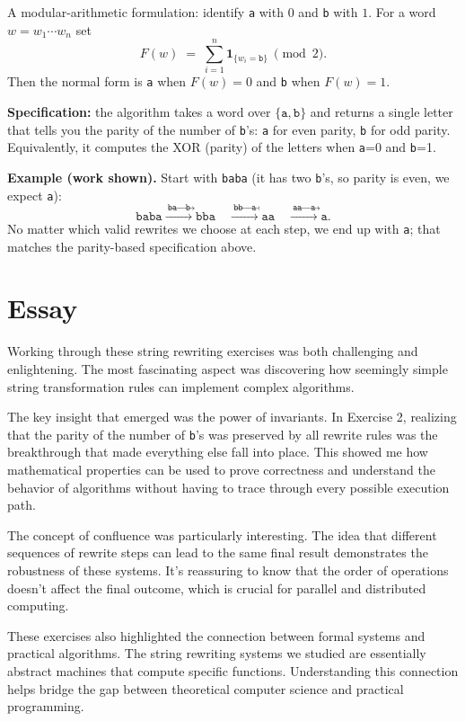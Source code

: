 \documentclass{article}
\theoremstyle{plain}
\theoremstyle{definition}
\theoremstyle{remark}
\begin{document}
\begin{enumerate}[label=(\alph*)]
  A modular-arithmetic formulation: identify \texttt{a} with $0$ and \texttt{b} with $1$. For a word $w=w_1\cdots w_n$ set
  \[
    F(w)\;=\;\sum_{i=1}^n \mathbf{1}_{\{w_i=\texttt{b}\}}\ \pmod{2}.
  \]
  Then the normal form is \texttt{a} when $F(w)=0$ and \texttt{b} when $F(w)=1$.
  
  \textbf{Specification:} the algorithm takes a word over $\{\texttt{a},\texttt{b}\}$ and returns a single letter that tells you the parity of the number of \texttt{b}'s: \texttt{a} for even parity, \texttt{b} for odd parity. Equivalently, it computes the XOR (parity) of the letters when \texttt{a}=0 and \texttt{b}=1.
\end{enumerate}

\bigskip

\textbf{Example (work shown).} Start with \texttt{baba} (it has two \texttt{b}'s, so parity is even, we expect \texttt{a}):
\[
\texttt{baba} \xrightarrow{\ \texttt{ba}\to\texttt{b}\ } \texttt{bba}
\quad\xrightarrow{\ \texttt{bb}\to\texttt{a}\ } \texttt{aa}
\quad\xrightarrow{\ \texttt{aa}\to\texttt{a}\ } \texttt{a}.
\]
No matter which valid rewrites we choose at each step, we end up with \texttt{a}; that matches the parity-based specification above.

\section{Essay}

Working through these string rewriting exercises was both challenging and enlightening. The most fascinating aspect was discovering how seemingly simple string transformation rules can implement complex algorithms. 

The key insight that emerged was the power of invariants. In Exercise 2, realizing that the parity of the number of \texttt{b}'s was preserved by all rewrite rules was the breakthrough that made everything else fall into place. This showed me how mathematical properties can be used to prove correctness and understand the behavior of algorithms without having to trace through every possible execution path.

The concept of confluence was particularly interesting. The idea that different sequences of rewrite steps can lead to the same final result demonstrates the robustness of these systems. It's reassuring to know that the order of operations doesn't affect the final outcome, which is crucial for parallel and distributed computing.

These exercises also highlighted the connection between formal systems and practical algorithms. The string rewriting systems we studied are essentially abstract machines that compute specific functions. Understanding this connection helps bridge the gap between theoretical computer science and practical programming.
\end{document}
